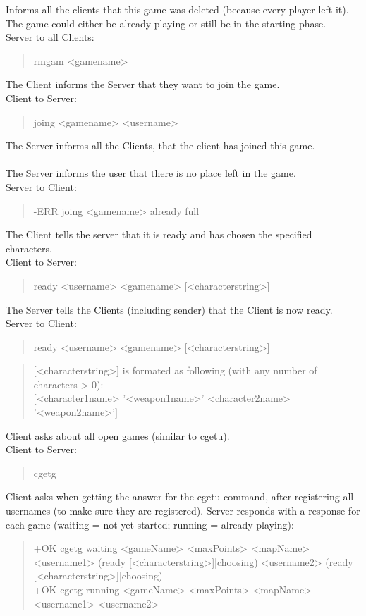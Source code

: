 \documentclass[a4paper,11pt]{article}
\begin{document}
Informs all the clients that this game was deleted (because every player left it).	The game could either be already playing or still be in the starting phase.\\
Server to all Clients:
\begin{quote}
  rmgam <gamename>
\end{quote}

\noindent
The Client informs the Server that they want to join the game.\\
Client to Server:
\begin{quote}
  joing <gamename> <username>
\end{quote}

\noindent
The Server informs all the Clients, that the client has joined this game.\\\\

The Server informs the user that there is no place left in the game.\\
Server to Client:
\begin{quote}
  -ERR joing <gamename> already full
\end{quote}

\noindent
The Client tells the server that it is ready and has chosen the specified characters.\\
Client to Server:
\begin{quote}
  ready <username> <gamename> [<characterstring>]
\end{quote}

\noindent
The Server tells the Clients (including sender) that the Client is now ready.
Server to Client:
\begin{quote}
  ready <username> <gamename> [<characterstring>]
\end{quote}
\begin{quote}
  $[$<characterstring>$]$  is formated as following (with any number of characters > 0):\\
	$[$<character1name> '<weapon1name>' <character2name> '<weapon2name>'$]$ 
\end{quote}	

\noindent
Client asks about all open games (similar to cgetu).\\
Client to Server:
\begin{quote}
  cgetg
\end{quote}

\noindent	
Client asks when getting the answer for the cgetu command, after registering all usernames (to make sure they are registered).
Server responds with a response for each game (waiting = not yet started; running = already playing):
\begin{quote}
  +OK cgetg waiting <gameName> <maxPoints> <mapName> <username1> (ready [<characterstring>]|choosing) <username2> (ready [<characterstring>]|choosing)\\
  +OK cgetg running <gameName> <maxPoints> <mapName> <username1> <username2>
\end{quote}
\end{document}
